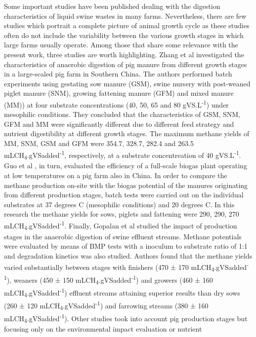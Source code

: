 Some important studies have been published dealing with the digestion characteristics of liquid swine wastes in many farms. Nevertheless, there are few studies which portrait a complete picture of animal growth cycle as these studies often do not include the variability between the various growth stages in which large farms usually operate. Among those that share some relevance with the present work, three studies are worth highlighting. Zhang et al \cite{Zhang_2014} investigated the characteristics of anaerobic digestion of pig manure from different growth stages in a large-scaled pig farm in Southern China. The authors performed batch experiments using gestating sow manure (GSM), swine nursery with post-weaned piglet manure (SNM), growing fattening manure (GFM) and mixed manure (MM))  at four substrate concentrations (40, 50, 65 and 80 gVS.L\textsuperscript{-1}) under mesophilic conditions. They concluded that the characteristics of GSM, SNM, GFM and MM were significantly different due to different feed strategy and nutrient digestibility at different growth stages. The maximum methane yields of MM, SNM, GSM and GFM were 354.7, 328.7, 282.4 and 263.5 mLCH\textsubscript{4}.gVSadded\textsuperscript{-1}, respectively, at a substrate concentreation of 40 gVS.L\textsuperscript{-1}. Guo et al \cite{Guo_2012}, in turn, evaluated the efficiency of a full-scale biogas plant operating at low temperatures on a pig farm also in China. In order to compare the methane production on-site with the biogas potential of the manures originating from different production stages, batch tests were carried out on the individual substrates at 37 degrees C (mesophilic conditions) and 20 degrees C. In this research the methane yields for sows, piglets and fattening were 290, 290, 270 mLCH\textsubscript{4}.gVSadded\textsuperscript{-1}. Finally, Gopalan et al \cite{Gopalan_2013} studied the impact of production stages in the anaerobic digestion of swine effluent streams. Methane potentials were evaluated by means of BMP tests with a inoculum to substrate ratio of 1:1 and degradation kinetics was also studied. Authors found that the methane yields varied substantially between stages with finishers (470 ± 170 mLCH\textsubscript{4}.gVSadded\textsuperscript{-1}), weaners (450 ± 150 mLCH\textsubscript{4}.gVSadded\textsuperscript{-1}) and growers (460 ± 160 mLCH\textsubscript{4}.gVSadded\textsuperscript{-1})
effluent streams attaining superior results than dry sows (260 ± 120 mLCH\textsubscript{4}.gVSadded\textsuperscript{-1}) and farrowing
streams (380 ± 160 mLCH\textsubscript{4}.gVSadded\textsuperscript{-1}). 
Other studies took into account pig production stages but focusing only on the environmental impact evaluation or nutrient
